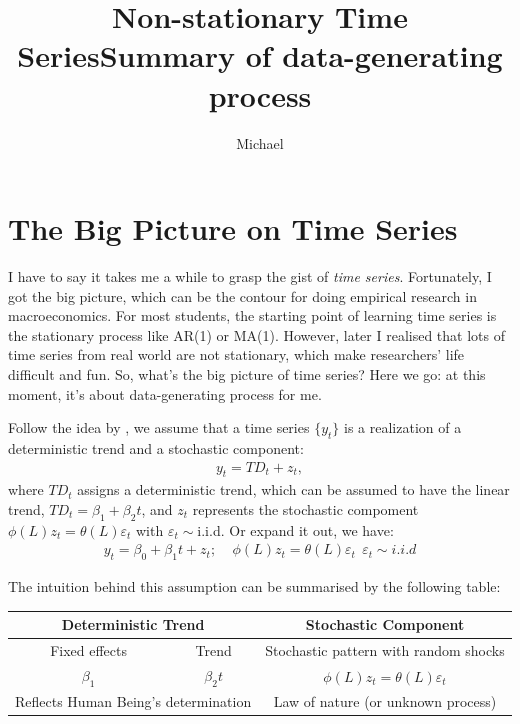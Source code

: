 \documentclass[12pt]{article}
\theoremstyle{definition}
\numberwithin{equation}{section}
\numberwithin{figure}{section}
\numberwithin{table}{section}
\begin{document}
\title{Non-stationary Time Series}
\author{Michael}
\date{}
\maketitle

\section{The Big Picture on Time Series}

I have to say it takes me a while to grasp the gist of \textit{time series}. Fortunately, I got the big picture, which can be the contour for doing empirical research in macroeconomics. For most students, the starting point of learning time series is the stationary process like AR(1) or MA(1). However, later I realised that lots of time series from real world are not stationary, which make researchers' life difficult and fun. So, what's the big picture of time series? Here we go: at this moment, it's about data-generating process for me.

Follow the idea by \cite{campbell1991pitfalls}, we assume that a time series $\{y_t\}$ is a realization of a deterministic trend and a stochastic component:
\begin{align}
  y_t = TD_t + z_t,
\end{align}
where $TD_t$ assigns a deterministic trend, which can be assumed to have the linear trend, $TD_t = \beta_1 + \beta_2 t$, and $z_t$ represents the stochastic compoment $\phi(L)z_t = \theta(L) \varepsilon_t$ with $\varepsilon_t \sim$i.i.d. Or expand it out, we have:
\begin{align*}
  y_t = \beta_0 + \beta_1 t + z_t; \ \ \ \ \ \phi(L)z_t = \theta(L) \varepsilon_t \ \ \varepsilon_t \sim i.i.d
\end{align*}

The intuition behind this assumption can be summarised by the following table:
\begin{table}[H]
  \centering
  \renewcommand{\arraystretch}{1.2}
  \title{Summary of data-generating process}
  \begin{tabular}{ccc}
    \hline
    \hline
    \multicolumn{2}{c}{\textbf{Deterministic Trend}} & \textbf{Stochastic Component} \\
    \hline
    Fixed effects & Trend & Stochastic pattern with random shocks \\
    \hline
    $\beta_1$ & $\beta_2 t$ & $\phi(L)z_t = \theta(L) \varepsilon_t$ \\
    \hline
    \multicolumn{2}{c}{Reflects Human Being's determination} & Law of nature (or unknown process) \\
    \hline
  \end{tabular}
\end{table}
\end{document}

